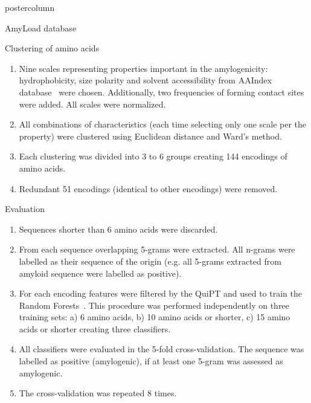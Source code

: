 \documentclass[final]{beamer}\usepackage[]{graphicx}\usepackage[]{color}
\begin{document}
\begin{frame}
\begin{columns}
\begin{column}{.50\textwidth}
\begin{beamercolorbox}[center,wd=\textwidth]{postercolumn}
\begin{minipage}[T]{.95\textwidth}
{\begin{block}{AmyLoad database}
\end{block}
\vfill

\begin{block}{Clustering of amino acids}

\begin{enumerate}[1.]
\item Nine scales representing properties important in the amylogenicity: hydrophobicity, size polarity and solvent accessibility from AAIndex database~\citep{kawashima_aaindex:_2008} were chosen. Additionally, two frequencies of forming contact sites~\citep{wozniak_characteristics_2014} were added. All scales were normalized.
\item All combinations of characteristics (each time selecting only one scale per the property) were clustered using Euclidean distance and Ward's method.
\item Each clustering was divided into 3 to 6 groups creating 144 encodings of amino acids.
\item Redundant 51 encodings (identical to other encodings) were removed.
\end{enumerate}

\end{block}
\vfill

\begin{block}{Evaluation}

\begin{enumerate}[1.]
\item Sequences shorter than 6 amino acids were discarded.
\item From each sequence overlapping 5-grams were extracted. All n-grams were labelled as their sequence of the origin (e.g. all 5-grams extracted from amyloid sequence were labelled as positive).
\item For each encoding features were filtered by the QuiPT and used to train the Random Forests~\citep{liaw_classification_2002}. This procedure was performed independently on three training sets: a) 6 amino acids, b) 10 amino acids or shorter, c) 15 amino acids or shorter creating three classifiers.
\item All classifiers were evaluated in the 5-fold cross-validation. The sequence was labelled as positive (amylogenic), if at least one 5-gram was assessed as amylogenic.
\item The cross-validation was repeated 8 times.
\end{enumerate}

\end{block}
\vfill

}
\end{minipage}
\end{beamercolorbox}
\end{column}
\end{columns}
\end{frame}
\end{document}
